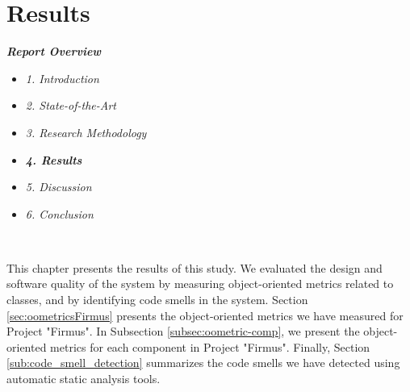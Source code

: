 
\chapter{Results}
\label{chap:results}

\textit{\textbf{Report Overview}}
\begin{itemize}
	\item \textit{1. Introduction}
	\item \textit{2. State-of-the-Art}
	\item \textit{3. Research Methodology}
	\item \textit{\textbf{4. Results}}
	\item \textit{5. Discussion}
	\item \textit{6. Conclusion}
\end{itemize} \


This chapter presents the results of this study. We evaluated the design and software quality of the system by measuring object-oriented metrics related to classes, and by identifying code smells in the system. Section \ref{sec:oometricsFirmus} presents the object-oriented metrics we have measured for Project "Firmus". In Subsection \ref{subsec:oometric-comp}, we present the object-oriented metrics for each component in Project "Firmus". Finally, Section \ref{sub:code_smell_detection} summarizes the code smells we have detected using automatic static analysis tools.







